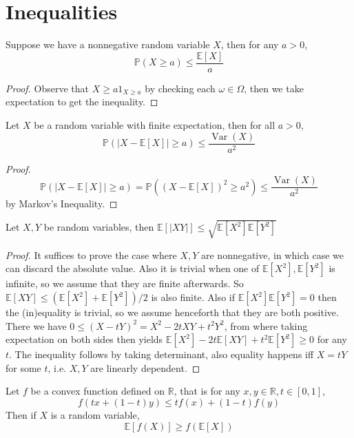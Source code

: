 \section{Inequalities}
\begin{theorem}
    Suppose we have a nonnegative random variable $X$, then for any $a>0$,
    $$\mathbb P(X\ge a)\le\frac{\mathbb E[X]}{a}$$
\end{theorem}
\begin{proof}
    Observe that $X\ge a1_{X\ge a}$ by checking each $\omega\in\Omega$, then we take expectation to get the inequality.
\end{proof}
\begin{theorem}
    Let $X$ be a random variable with finite expectation, then for all $a>0$,
    $$\mathbb P(|X-\mathbb E[X]|\ge a)\le\frac{\operatorname{Var}(X)}{a^2}$$
\end{theorem}
\begin{proof}
    $$\mathbb P(|X-\mathbb E[X]|\ge a)=\mathbb P((X-\mathbb E[X])^2\ge a^2)\le\frac{\operatorname{Var}(X)}{a^2}$$
    by Markov's Inequality.
\end{proof}
\begin{theorem}
    Let $X,Y$ be random variables, then $\mathbb E[|XY|]\le\sqrt{\mathbb E[X^2]\mathbb E[Y^2]}$
\end{theorem}
\begin{proof}
    It suffices to prove the case where $X,Y$ are nonnegative, in which case we can discard the absolute value.
    Also it is trivial when one of $\mathbb E[X^2],\mathbb E[Y^2]$ is infinite, so we assume that they are finite afterwards.
    So $\mathbb E[XY]\le (\mathbb E[X^2]+\mathbb E[Y^2])/2$ is also finite.
    Also if $\mathbb E[X^2]\mathbb E[Y^2]=0$ then the (in)equality is trivial, so we assume henceforth that they are both positive.
    There we have $0\le (X-tY)^2=X^2-2tXY+t^2Y^2$, from where taking expectation on both sides then yields $\mathbb E[X^2]-2t\mathbb E[XY]+t^2\mathbb E[Y^2]\ge 0$ for any $t$.
    The inequality follows by taking determinant, also equality happens iff $X=tY$ for some $t$, i.e. $X,Y$ are linearly dependent.
\end{proof}
\begin{theorem}
    Let $f$ be a convex function defined on $\mathbb R$, that is for any $x,y\in\mathbb R, t\in[0,1]$,
    $$f(tx+(1-t)y)\le tf(x)+(1-t)f(y)$$
    Then if $X$ is a random variable,
    $$\mathbb E[f(X)]\ge f(\mathbb E[X])$$
\end{theorem}
